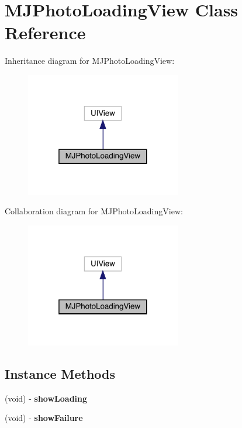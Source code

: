 \hypertarget{interface_m_j_photo_loading_view}{}\section{M\+J\+Photo\+Loading\+View Class Reference}
\label{interface_m_j_photo_loading_view}


Inheritance diagram for M\+J\+Photo\+Loading\+View\+:\nopagebreak
\begin{figure}[H]
\begin{center}
\leavevmode
\includegraphics[width=193pt]{interface_m_j_photo_loading_view__inherit__graph}
\end{center}
\end{figure}


Collaboration diagram for M\+J\+Photo\+Loading\+View\+:\nopagebreak
\begin{figure}[H]
\begin{center}
\leavevmode
\includegraphics[width=193pt]{interface_m_j_photo_loading_view__coll__graph}
\end{center}
\end{figure}
\subsection*{Instance Methods}
\begin{DoxyCompactItemize}
\item 
\mbox{\label{interface_m_j_photo_loading_view_a14f6106af464b4ee84f5c23ee3d67e41}} 
(void) -\/ {\bfseries show\+Loading}
\item 
\mbox{\label{interface_m_j_photo_loading_view_a47dbf27d33ae3d38c62caebb35e4389e}} 
(void) -\/ {\bfseries show\+Failure}
\end{DoxyCompactItemize}
